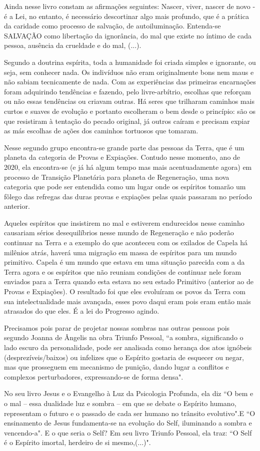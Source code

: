 \emdash{}Ainda nesse livro constam as afirmações seguintes: Nascer, viver, nascer de novo - é a Lei, no entanto, é necessário descortinar algo mais profundo, que é a prática da caridade como processo de salvação, de autoiluminação. Entenda-se SALVAÇÃO como libertação da ignorância, do mal que existe no íntimo de cada pessoa, ausência da crueldade e do mal, (...).

\emdash{}Segundo a doutrina espírita, toda a humanidade foi criada simples e ignorante, ou seja, sem conhecer nada. Os indivíduos não eram originalmente bons nem maus e não sabiam tecnicamente de nada. Com as experiências das primeiras encarnações foram adquirindo tendências e fazendo, pelo livre-arbítrio, escolhas que reforçam ou não essas tendências ou criavam outras. Há seres que trilharam caminhos mais curtos e suaves de evolução e portanto escolheram o bem desde o princípio: são os que resistiram à tentação do pecado original, já outros caíram e precisam expiar as más escolhas de ações dos caminhos tortuosos que tomaram.

\emdash{}Nesse segundo grupo encontra-se grande parte das pessoas da Terra, que é um planeta da categoria de Provas e Expiações. Contudo nesse momento, ano de 2020, ela encontra-se (e já há algum tempo mas mais acentuadamente agora) em processo de Transição Planetária para planeta de Regeneração, uma nova categoria que pode ser entendida como um lugar onde os espíritos tomarão um fôlego das refregas das duras provas e expiações pelas quais passaram no período anterior.

\emdash{}Aqueles espíritos que insistirem no mal e estiverem endurecidos nesse caminho causariam sérios desequilíbrios nesse mundo de Regeneração e não poderão continuar na Terra e a exemplo do que aconteceu com os exilados de Capela há milênios atrás, haverá uma migração em massa de espíritos para um mundo primitivo. Capela é um mundo que estava em uma situação parecida com a da Terra agora e os espíritos que não reuniam condições de continuar nele foram enviados para a Terra quando esta estava no seu estado Primitivo (anterior ao de Provas e Expiações). O resultado foi que eles evoluíram os povos da Terra com sua intelectualidade mais avançada, esses povo daqui eram pois eram então mais atrasados do que eles. É a lei do Progresso agindo.

\emdash{}Precisamos pois parar de projetar nossas sombras nas outras pessoas pois segundo Joanna de Ângelis na obra Triunfo Pessoal, ``a sombra, significando o lado escuro da personalidade, pode ser analisada como herança dos atos ignóbeis (desprezíveis/baixos) ou infelizes que o Espírito gostaria de esquecer ou negar, mas que prosseguem em mecanismo de punição, dando lugar a conflitos e complexos perturbadores, expressando-se de forma densa". 

\emdash{}No seu livro Jesus e o Evangelho à Luz da Psicologia Profunda, ela diz ``O bem e o mal – essa dualidade luz e sombra – em que se debate o Espírito humano, representam o futuro e o passado de cada ser humano no trânsito evolutivo".E ``O ensinamento de Jesus fundamenta-se na evolução do Self, iluminando a sombra e vencendo-a". E o que seria o Self? Em seu livro Triunfo Pessoal, ela traz: ``O Self é o Espírito imortal, herdeiro de si mesmo,(...)".
